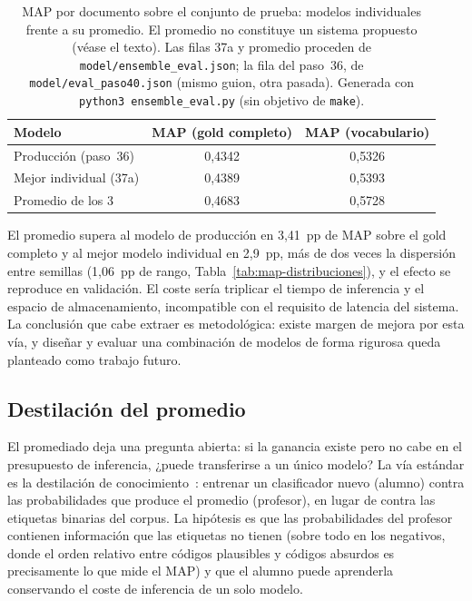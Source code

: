 \begin{table}[h]
\centering
\caption{MAP por documento sobre el conjunto de prueba: modelos individuales frente a su promedio. El promedio no constituye un sistema propuesto (véase el texto). Las filas 37a y promedio proceden de \texttt{model/\allowbreak ensemble\_eval.json}; la fila del paso~36, de \texttt{model/\allowbreak eval\_paso40.json} (mismo guion, otra pasada). Generada con \texttt{python3 ensemble\_eval.py} (sin objetivo de \texttt{make}).}
\label{tab:map-ensemble}
\begin{tabular}{lcc}
\hline
\textbf{Modelo} & \textbf{MAP (gold completo)} & \textbf{MAP (vocabulario)} \\
\hline
Producción (paso~36) & 0{,}4342 & 0{,}5326 \\
Mejor individual (37a) & 0{,}4389 & 0{,}5393 \\
Promedio de los 3 & 0{,}4683 & 0{,}5728 \\
\hline
\end{tabular}
\end{table}

El promedio supera al modelo de producción en 3{,}41~pp de MAP sobre el gold completo y al mejor modelo individual en 2{,}9~pp, más de dos veces la dispersión entre semillas (1,06~pp de rango, Tabla~\ref{tab:map-distribuciones}), y el efecto se reproduce en validación. El coste sería triplicar el tiempo de inferencia y el espacio de almacenamiento, incompatible con el requisito de latencia del sistema. La conclusión que cabe extraer es metodológica: existe margen de mejora por esta vía, y diseñar y evaluar una combinación de modelos de forma rigurosa queda planteado como trabajo futuro.

\subsection{Destilación del promedio}

El promediado deja una pregunta abierta: si la ganancia existe pero no cabe en el presupuesto de inferencia, ¿puede transferirse a un único modelo? La vía estándar es la destilación de conocimiento~\cite{hinton2015distilling}: entrenar un clasificador nuevo (alumno) contra las probabilidades que produce el promedio (profesor), en lugar de contra las etiquetas binarias del corpus. La hipótesis es que las probabilidades del profesor contienen información que las etiquetas no tienen (sobre todo en los negativos, donde el orden relativo entre códigos plausibles y códigos absurdos es precisamente lo que mide el MAP) y que el alumno puede aprenderla conservando el coste de inferencia de un solo modelo.

